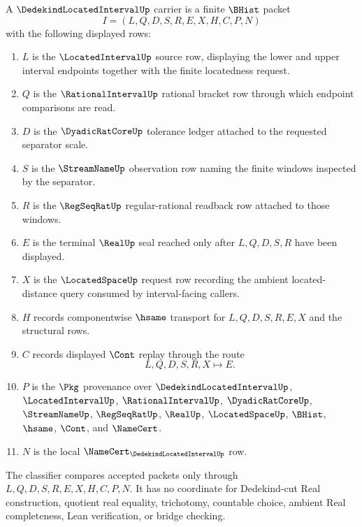 \begin{definition}
\label{def:dedekind-located-interval-carrier}
A $\DedekindLocatedIntervalUp$ carrier is a finite $\BHist$ packet
$$
I=(L,Q,D,S,R,E,X,H,C,P,N)
$$
with the following displayed rows:
\begin{enumerate}
\item $L$ is the $\LocatedIntervalUp$ source row, displaying the lower and upper interval endpoints together with the finite locatedness request.
\item $Q$ is the $\RationalIntervalUp$ rational bracket row through which endpoint comparisons are read.
\item $D$ is the $\DyadicRatCoreUp$ tolerance ledger attached to the requested separator scale.
\item $S$ is the $\StreamNameUp$ observation row naming the finite windows inspected by the separator.
\item $R$ is the $\RegSeqRatUp$ regular-rational readback row attached to those windows.
\item $E$ is the terminal $\RealUp$ seal reached only after $L,Q,D,S,R$ have been displayed.
\item $X$ is the $\LocatedSpaceUp$ request row recording the ambient located-distance query consumed by interval-facing callers.
\item $H$ records componentwise $\hsame$ transport for $L,Q,D,S,R,E,X$ and the structural rows.
\item $C$ records displayed $\Cont$ replay through the route
$$
L,Q,D,S,R,X \longmapsto E .
$$
\item $P$ is the $\Pkg$ provenance over $\DedekindLocatedIntervalUp$, $\LocatedIntervalUp$, $\RationalIntervalUp$, $\DyadicRatCoreUp$, $\StreamNameUp$, $\RegSeqRatUp$, $\RealUp$, $\LocatedSpaceUp$, $\BHist$, $\hsame$, $\Cont$, and $\NameCert$.
\item $N$ is the local $\NameCert_{\DedekindLocatedIntervalUp}$ row.
\end{enumerate}
The classifier compares accepted packets only through $L,Q,D,S,R,E,X,H,C,P,N$. It has no coordinate for Dedekind-cut Real construction, quotient real equality, trichotomy, countable choice, ambient Real completeness, Lean verification, or bridge checking.
\end{definition}

